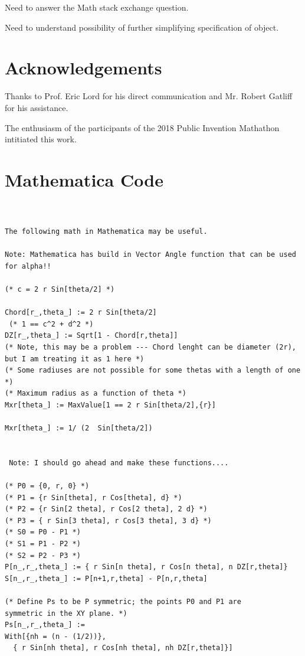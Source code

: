 \documentclass[11pt]{article}
\begin{document}
{Need to answer the Math stack  exchange question.

Need to understand possibility of further simplifying specification of object.

\section{Acknowledgements}

Thanks to Prof. Eric Lord for his direct communication and Mr. Robert Gatliff for his
assistance.

The enthusiasm of the participants of the 2018 Public Invention Mathathon
intitiated this work.




\appendix

\section{Mathematica Code}

\begin{verbatim}


The following math in Mathematica may be useful.

Note: Mathematica has build in Vector Angle function that can be used for alpha!!

(* c = 2 r Sin[theta/2] *)

Chord[r_,theta_] := 2 r Sin[theta/2]
 (* 1 == c^2 + d^2 *)
DZ[r_,theta_] := Sqrt[1 - Chord[r,theta]]
(* Note, this may be a problem --- Chord lenght can be diameter (2r), but I am treating it as 1 here *)
(* Some radiuses are not possible for some thetas with a length of one *)
(* Maximum radius as a function of theta *)
Mxr[theta_] := MaxValue[1 == 2 r Sin[theta/2],{r}]

Mxr[theta_] := 1/ (2  Sin[theta/2])


 Note: I should go ahead and make these functions....

(* P0 = {0, r, 0} *)
(* P1 = {r Sin[theta], r Cos[theta], d} *)
(* P2 = {r Sin[2 theta], r Cos[2 theta], 2 d} *)
(* P3 = { r Sin[3 theta], r Cos[3 theta], 3 d} *)
(* S0 = P0 - P1 *)
(* S1 = P1 - P2 *)
(* S2 = P2 - P3 *)
P[n_,r_,theta_] := { r Sin[n theta], r Cos[n theta], n DZ[r,theta]}
S[n_,r_,theta_] := P[n+1,r,theta] - P[n,r,theta]

(* Define Ps to be P symmetric; the points P0 and P1 are
symmetric in the XY plane. *)
Ps[n_,r_,theta_] :=
With[{nh = (n - (1/2))},
  { r Sin[nh theta], r Cos[nh theta], nh DZ[r,theta]}]



\end{verbatim}}
\end{document}
